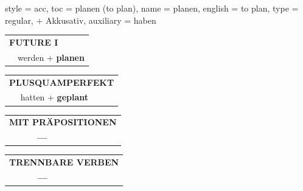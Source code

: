 \begin{verbentry}{
  style = {acc},
  toc = {planen (to plan)},
  name = {planen},
  english = {to plan},
  type = {regular, + Akkusativ},
  auxiliary = {haben}
}
\begin{tabular}{rl}
    \multicolumn{2}{l}{\textbf{FUTURE I} }\\
   & werden + \textbf{planen}\\
 
  \end{tabular}
\hfill
   \begin{tabular}{rl}
      \multicolumn{2}{l}{\textbf{PLUSQUAMPERFEKT}}\\
   & hatten + \textbf{geplant}\\
  \end{tabular}
  
  
\vspace{10pt}

\begin{tabular}{lll}
\multicolumn{3}{l}{\textbf{MIT PRÄPOSITIONEN}}\\
& \textbf{---} & \\
\end{tabular}
\hfill
\begin{tabular}{lll}
\multicolumn{3}{l}{\textbf{TRENNBARE VERBEN}}\\
& \textbf{---} & \\
\end{tabular}
\vspace{-5pt}
\end{verbentry}


